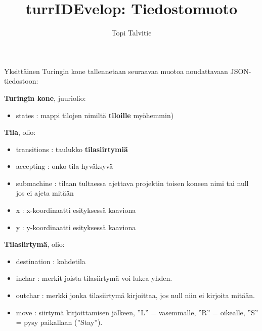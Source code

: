 \documentclass[a4paper, 11pt, finnish]{article}
\author{Topi Talvitie}
\title{turrIDEvelop: Tiedostomuoto}
\begin{document}
\maketitle

Yksittäinen Turingin kone tallennetaan seuraavaa muotoa noudattavaan
JSON-tiedostoon:

\textbf{Turingin kone}, juuriolio:
\begin{itemize}
\item states : mappi tilojen nimiltä \textbf{tiloille}
myöhemmin)
\end{itemize}

\textbf{Tila}, olio:
\begin{itemize}
\item transitions : taulukko \textbf{tilasiirtymiä}
\item accepting : onko tila hyväksyvä
\item submachine : tilaan tultaessa ajettava projektin toisen koneen nimi tai
null jos ei ajeta mitään
\item x : x-koordinaatti esityksessä kaaviona
\item y : y-koordinaatti esityksessä kaaviona
\end{itemize}

\textbf{Tilasiirtymä}, olio:
\begin{itemize}
\item destination : kohdetila
\item inchar : merkit joista tilasiirtymä voi lukea yhden.
\item outchar : merkki jonka tilasiirtymä kirjoittaa, jos null niin ei
kirjoita mitään.
\item move : siirtymä kirjoittamisen jälkeen, ''L'' = vasemmalle, ''R'' =
oikealle, ''S'' = pysy paikallaan (''Stay'').
\end{itemize}
\end{document}
